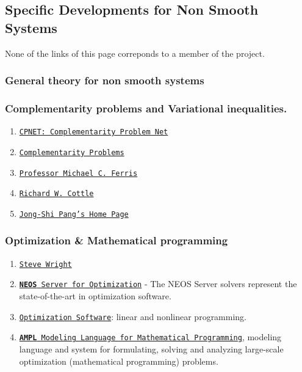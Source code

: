 \hypertarget{scientificComputing_sdns}{}\subsection{Specific Developments for Non Smooth Systems}\label{scientificComputing_sdns}
None of the links of this page correponds to a member of the project.\hypertarget{scientificComputing_sdns_1}{}\subsubsection{General theory for non smooth systems}\label{scientificComputing_sdns_1}
\hypertarget{scientificComputing_sdns_2}{}\subsubsection{Complementarity problems and Variational inequalities.}\label{scientificComputing_sdns_2}
\begin{enumerate}
\item \href{http://www.cs.wisc.edu/cpnet/}{\tt CPNET: Complementarity Problem Net}\item \href{http://plato.la.asu.edu/topics/problems/mcp.html}{\tt Complementarity Problems}\item \href{http://www.cs.wisc.edu/%7Eferris/}{\tt Professor Michael C. Ferris}\item \href{http://www.stanford.edu/dept/MSandE/faculty/rwc/}{\tt Richard W. Cottle}\item \href{http://www.mts.jhu.edu/%7Epang/}{\tt Jong-Shi Pang's Home Page}\end{enumerate}
\hypertarget{scientificComputing_sdns_3}{}\subsubsection{Optimization \& Mathematical programming}\label{scientificComputing_sdns_3}
\begin{enumerate}
\item \href{http://www.cs.wisc.edu/%7Eswright/}{\tt Steve Wright}\item \href{http://www-neos.mcs.anl.gov/}{\tt {\bf NEOS} Server for Optimization} - The NEOS Server solvers represent the state-of-the-art in optimization software.\item \href{http://www-fp.mcs.anl.gov/otc/Guide/softwareGuide/}{\tt Optimization Software}: linear and nonlinear programming.\item \href{http://www.ampl.com/}{\tt {\bf AMPL} Modeling Language for Mathematical Programming}, modeling language and system for formulating, solving and analyzing large-scale optimization (mathematical programming) problems.\end{enumerate}

